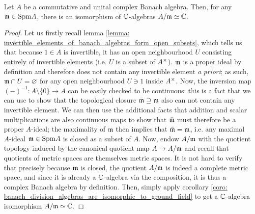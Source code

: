             \begin{proposition} \label{prop: residue_fields_of_commutative_banach_algebras}
                Let $A$ be a commutative and unital complex Banach algebra. Then, for any $\mathfrak{m} \in \mathrm{Spm} A$, there is an isomorphism of $\mathbb{C}$-algebras $A/\mathfrak{m} \simeq \mathbb{C}$. 
            \end{proposition}
                \begin{proof}
                    Let us firstly recall lemma \ref{lemma: invertible_elements_of_banach_algebras_form_open_subsets}, which tells us that because $1 \in A$ is invertible, it has an open neighbourhood $U$ consisting entirely of invertible elements (i.e. $U$ is a subset of $A^{\x}$). $\mathfrak{m}$ is a proper ideal by definition and therefore does not contain any invertible element \textit{a priori}; as such, $\mathfrak{m} \cap U = \varnothing$ for any open neighbourhood $U \ni 1$ inside $A^{\x}$. Now, the inversion map $(-)^{-1}: A \setminus \{0\} \to A$ can be easily checked to be continuous: this is a fact that we can use to show that the topological closure $\bar{\mathfrak{m}} \supseteq \mathfrak{m}$ also can not contain any invertible element. We can then use the additional facts that addition and scalar multiplications are also continuous maps to show that $\bar{\mathfrak{m}}$ must therefore be a proper $A$-ideal; the maximality of $\mathfrak{m}$ then implies that $\bar{\mathfrak{m}} = \mathfrak{m}$, i.e. any maximal $A$-ideal $\mathfrak{m} \in \mathrm{Spm} A$ is closed as a subset of $A$. Now, endow $A/\mathfrak{m}$ with the quotient topology induced by the canonical quotient map $A \to A/\mathfrak{m}$ and recall that quotients of metric spaces are themselves metric spaces. It is not hard to verify that precisely because $\mathfrak{m}$ is closed, the quotient $A/\mathfrak{m}$ is indeed a complete metric space, and since it is already a $\mathbb{C}$-algebra via the composition, it is thus a complex Banach algebra by definition. Then, simply apply corollary \ref{coro: banach_division_algebras_are_isomorphic_to_ground_field} to get a $\mathbb{C}$-algebra isomorphism $A/\mathfrak{m} \simeq \mathbb{C}$.
                \end{proof}
                
